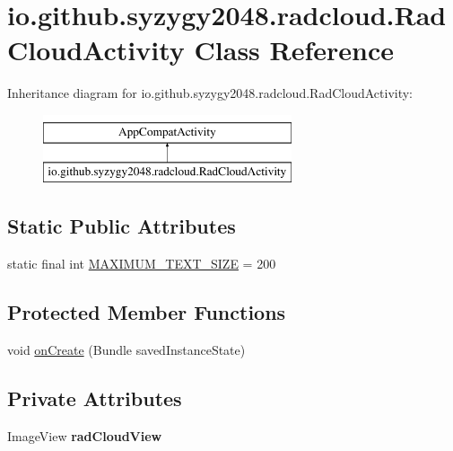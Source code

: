 \hypertarget{classio_1_1github_1_1syzygy2048_1_1radcloud_1_1_rad_cloud_activity}{}\section{io.\+github.\+syzygy2048.\+radcloud.\+Rad\+Cloud\+Activity Class Reference}
\label{classio_1_1github_1_1syzygy2048_1_1radcloud_1_1_rad_cloud_activity}
Inheritance diagram for io.\+github.\+syzygy2048.\+radcloud.\+Rad\+Cloud\+Activity\+:\begin{figure}[H]
\begin{center}
\leavevmode
\includegraphics[height=2.000000cm]{classio_1_1github_1_1syzygy2048_1_1radcloud_1_1_rad_cloud_activity}
\end{center}
\end{figure}
\subsection*{Static Public Attributes}
\begin{DoxyCompactItemize}
\item 
static final int \mbox{\hyperlink{classio_1_1github_1_1syzygy2048_1_1radcloud_1_1_rad_cloud_activity_a64bad45183574bf4c3a0af55fe8338f3}{M\+A\+X\+I\+M\+U\+M\+\_\+\+T\+E\+X\+T\+\_\+\+S\+I\+ZE}} = 200
\end{DoxyCompactItemize}
\subsection*{Protected Member Functions}
\begin{DoxyCompactItemize}
\item 
void \mbox{\hyperlink{classio_1_1github_1_1syzygy2048_1_1radcloud_1_1_rad_cloud_activity_a3f26b57f925b135a3242d688b93c9711}{on\+Create}} (Bundle saved\+Instance\+State)
\end{DoxyCompactItemize}
\subsection*{Private Attributes}
\begin{DoxyCompactItemize}
\item 
\mbox{\label{classio_1_1github_1_1syzygy2048_1_1radcloud_1_1_rad_cloud_activity_ab18fdc211e7be1230a828c02656d9a0e}} 
Image\+View {\bfseries rad\+Cloud\+View}
\end{DoxyCompactItemize}


